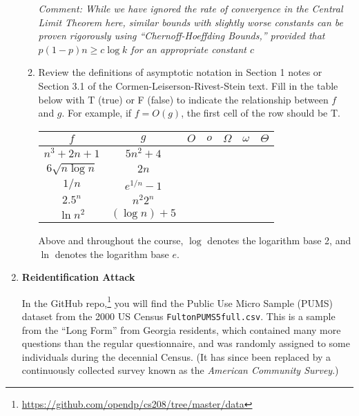 \documentclass[11pt]{article}
\begin{document}
\begin{enumerate}[leftmargin=*]
\begin{enumerate}
    
    {\em Comment: While we have ignored the rate of convergence in the Central Limit Theorem here, similar bounds with slightly worse constants can be proven rigorously using ``Chernoff-Hoeffding Bounds,'' provided that $p(1-p)n\geq c\log k$ for an appropriate constant $c$}
  
    
    \item Review the definitions of asymptotic notation in Section 1 notes or Section 3.1 of the Cormen-Leiserson-Rivest-Stein text.
    Fill in the table below with T (true) or F (false) to indicate the relationship between $f$ and $g$. For example, if $f=O(g)$, the first cell of the row should be T.
    
        \begin{center}
        \begin{tabular}{|c|c|c|c|c|c|c|}
        \hline
             $f$ & $g$ & $O$ & $o$ & $\Omega$ & $\omega$ & $\Theta$\\
             \hline
             $n^3+2n+1$ & $5n^2+4$ & & & & & \\            
             \hline
             $6\sqrt{n\log n}$ & $2n$ & & & & & \\
             \hline
             $1/n$ & $e^{1/n}-1$ & & & & & \\
             \hline
             $2.5^n$ & $n^2 2^n$ & & & & & \\
             \hline
             $\ln n^2$ & $(\log n) +5$ & & & & & \\
             \hline
        \end{tabular}
    \end{center}
    
    Above and throughout the course, $\log$ denotes the logarithm base 2, and $\ln$ denotes the logarithm base $e$.
    

\end{enumerate}


\item \textbf{Reidentification Attack}

In the GitHub repo,\footnote{\url{https://github.com/opendp/cs208/tree/master/data}} you will find the Public Use Micro Sample (PUMS) dataset from the 2000 US Census \texttt{FultonPUMS5full.csv}.  This is a sample from the ``Long Form'' from Georgia residents, which contained many more questions than the regular questionnaire, and was randomly assigned to some individuals during the decennial Census. (It has since been replaced by a continuously collected survey known as the \emph{American Community Survey}.)  


\end{enumerate}
\end{document}

